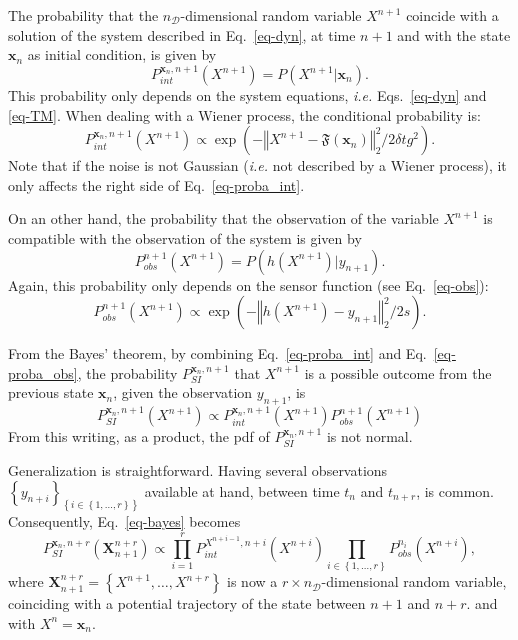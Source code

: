 \documentclass[aip,pof,nofootinbib,reprint,onecolumn]{revtex4-1}
\newcommand{\gras}[1]{\boldsymbol{#1}}
\newcommand{\mypar}[1]{\left(#1\right)}
\newcommand{\mya}[1]{\left\{#1\right\}}
\newcommand{\norme}[1]{\left\Vert #1\right\Vert_2}
\newcommand{\Nphaz}{n_{\mathcal{D}}} %
\newcommand{\fint}{\mathfrak{F}} %
\newcommand{\obs}{y} %
\newcommand{\point}{\gras{x}} %
\newcommand{\rpoint}{X}
\begin{document}
The probability that the $\Nphaz$-dimensional random variable $\rpoint^{n+1}$ coincide with a solution of the system described in Eq.~\eqref{eq-dyn}, at time $n+1$ and with the state $\point_{n}$ as initial condition, is given by
$$P^{\point_n,n+1}_{int}\mypar{\rpoint^{n+1}} = P\mypar{\rpoint^{n+1}|\point_n}.$$ 
This probability only depends on the system equations, \emph{i.e.} Eqs.~\eqref{eq-dyn} and \eqref{eq-TM}. When dealing with a Wiener process, the conditional probability is:
\begin{equation}
P^{\point_n,n+1}_{int}\mypar{\rpoint^{n+1}} \propto \exp \mypar{- \norme{\rpoint^{n+1} - \fint\mypar{\point_n}}^2/2\delta t g^2}.
\label{eq-proba_int}
\end{equation}
Note that if the noise is not Gaussian (\emph{i.e.} not described by a Wiener process), it only affects the right side of Eq.~\eqref{eq-proba_int}.

On an other hand, the probability that the observation of the variable $\rpoint^{n+1}$ is compatible with the observation of the system is given by
$$P^{n+1}_{obs}\mypar{\rpoint^{n+1}} = P\mypar{h\mypar{\rpoint^{n+1}}|\obs_{n+1}}.$$ 
Again, this probability only depends on the sensor function (see
Eq.~\eqref{eq-obs}):
\begin{equation}
 P^{n+1}_{obs}\mypar{\rpoint^{n+1}}  \propto \exp \mypar{- \norme{h\mypar{\rpoint^{n+1}} - y_{n+1}}^2/2s}.
\label{eq-proba_obs}
\end{equation}

From the Bayes' theorem, by combining Eq.~\eqref{eq-proba_int} and Eq.~\eqref{eq-proba_obs}, the probability $P^{\point_n,n+1}_{SI}$ that $\rpoint^{n+1}$ is a possible outcome from the previous state $\point_n$, given the observation $\obs_{n+1}$, is
\begin{equation}
P^{\point_n,n+1}_{SI}\mypar{\rpoint^{n+1}} \propto P^{\point_n,n+1}_{int}\mypar{\rpoint^{n+1}} P^{n+1}_{obs}\mypar{\rpoint^{n+1}}
\label{eq-bayes}
\end{equation}
From this writing, as a product, the pdf of $P^{\point_n,n+1}_{SI}$ is not normal.

Generalization is straightforward. 
Having several observations $\mya{\obs_{n+i}}_{\mya{i\in \mya{1,\hdots,r}}}$ available at hand, between time $t_n$ and $t_{n+r}$, is common. 
Consequently,  Eq.~\eqref{eq-bayes} becomes
\begin{equation}
P^{\point_n,n+r}_{SI}\mypar{\gras{\rpoint}_{n+1}^{n+r}} \propto \prod_{i=1}^r P^{\rpoint^{n+i-1},n+i}_{int}\mypar{\rpoint^{n+i}} \prod_{i\in \mya{1,\hdots,r}} P^{n_i}_{obs}\mypar{\rpoint^{n+i}},
\label{eq-SI}
\end{equation}
where $\gras{\rpoint}_{n+1}^{n+r} = \mya{\rpoint^{n+1}, \hdots,\rpoint^{n+r}}$ is now a $r\times\Nphaz$-dimensional random variable, coinciding with a potential trajectory of the state between $n+1$ and ${n+r}$. and with $\rpoint^n = \point_n$.
\end{document}
